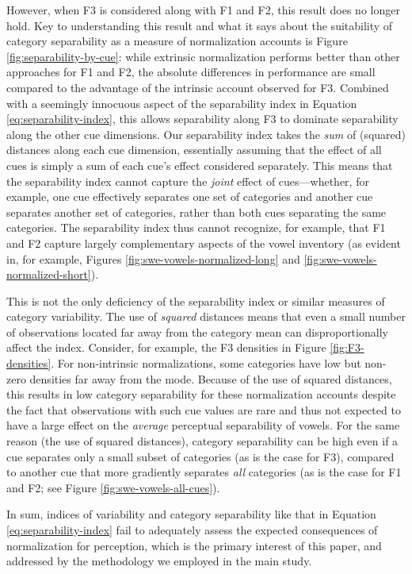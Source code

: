 \documentclass[utf8]{frontiers_suppmat} %
\begin{document}
However, when F3 is considered along with F1 and F2, this result does no longer hold. Key to understanding this result and what it says about the suitability of category separability as a measure of normalization accounts is Figure \ref{fig:separability-by-cue}: while extrinsic normalization performs better than other approaches for F1 and F2, the absolute differences in performance are small compared to the advantage of the intrinsic account observed for F3. Combined with a seemingly innocuous aspect of the separability index in Equation \eqref{eq:separability-index}, this allows separability along F3 to dominate separability along the other cue dimensions. Our separability index takes the \emph{sum} of (squared) distances along each cue dimension, essentially assuming that the effect of all cues is simply a sum of each cue's effect considered separately. This means that the separability index cannot capture the \emph{joint} effect of cues---whether, for example, one cue effectively separates one set of categories and another cue separates another set of categories, rather than both cues separating the same categories. The separability index thus cannot recognize, for example, that F1 and F2 capture largely complementary aspects of the vowel inventory (as evident in, for example, Figures \ref{fig:swe-vowels-normalized-long} and \ref{fig:swe-vowels-normalized-short}).

This is not the only deficiency of the separability index or similar measures of category variability. The use of \emph{squared} distances means that even a small number of observations located far away from the category mean can disproportionally affect the index. Consider, for example, the F3 densities in Figure \ref{fig:F3-densities}. For non-intrinsic normalizations, some categories have low but non-zero densities far away from the mode. Because of the use of squared distances, this results in low category separability for these normalization accounts despite the fact that observations with such cue values are rare and thus not expected to have a large effect on the \emph{average} perceptual separability of vowels. For the same reason (the use of squared distances), category separability can be high even if a cue separates only a small subset of categories (as is the case for F3), compared to another cue that more gradiently separates \emph{all} categories (as is the case for F1 and F2; see Figure \ref{fig:swe-vowels-all-cues}).

In sum, indices of variability and category separability like that in Equation \eqref{eq:separability-index} fail to adequately assess the expected consequences of normalization for perception, which is the primary interest of this paper, and addressed by the methodology we employed in the main study.
\end{document}
